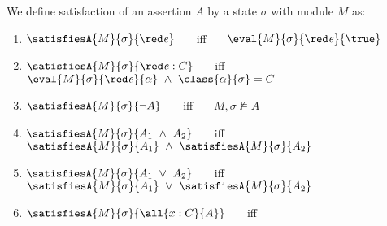 \begin{definition} 
\label{def:chainmail-semantics}
We define satisfaction of an assertion $A$ by a %
state $\sigma$ with 
 module $M$ as:
\begin{enumerate}
\item
\label{cExpr}
$\satisfiesA{M}{\sigma}{\sdOct{\re}}$ \ \ \ iff \ \ \  $\eval{M}{\sigma}{\sdOct{\re}}{\true}$
\item
\label{cClass}
$\satisfiesA{M}{\sigma}{{\sdOct{\re}} : C}$ \ \ \ iff \ \ \  $\eval{M}{\sigma}{\sdOct{\re}}{\alpha}\   \wedge \ \class{\alpha} {\sigma}= C$
\item
$\satisfiesA{M}{\sigma}{\neg A}$ \ \ \ iff \ \ \  ${M},{\sigma}\nvDash{A}$
\item
$\satisfiesA{M}{\sigma}{A_1\ \wedge\ A_2}$ \ \ \ iff \ \ \  $\satisfiesA{M}{\sigma}{A_1} \   \wedge \ \satisfiesA{M}{\sigma}{A_2}$
\item
$\satisfiesA{M}{\sigma}{A_1\ \vee\ A_2}$ \ \ \ iff \ \ \  $\satisfiesA{M}{\sigma}{A_1}\   \vee \ \satisfiesA{M}{\sigma}{A_2}$

\item
\label{quant1}
$\satisfiesA{M}{\sigma}{\all{x:C}{A}}$ \ \ \ iff \ \ \  


\end{enumerate}
\end{definition}

